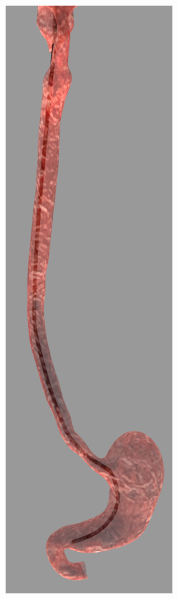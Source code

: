 \documentclass[12pt,a4]{article}
\begin{document}
\begin{figure}[ht!]
\begin{subfigure}{0.15\textwidth}
    \end{subfigure}%
    ~
        \begin{subfigure}{0.15\textwidth}
        \centering
        \includegraphics[width=0.75\linewidth]{figures/GIsnaps/5.png}
      

\end{subfigure}
\end{figure}
\end{document}
